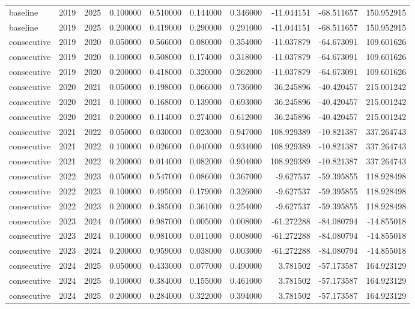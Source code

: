 \begin{tabular}{lrrrrrrrrr}
baseline & 2019 & 2025 & 0.100000 & 0.510000 & 0.144000 & 0.346000 & -11.044151 & -68.511657 & 150.952915 \\
baseline & 2019 & 2025 & 0.200000 & 0.419000 & 0.290000 & 0.291000 & -11.044151 & -68.511657 & 150.952915 \\
consecutive & 2019 & 2020 & 0.050000 & 0.566000 & 0.080000 & 0.354000 & -11.037879 & -64.673091 & 109.601626 \\
consecutive & 2019 & 2020 & 0.100000 & 0.508000 & 0.174000 & 0.318000 & -11.037879 & -64.673091 & 109.601626 \\
consecutive & 2019 & 2020 & 0.200000 & 0.418000 & 0.320000 & 0.262000 & -11.037879 & -64.673091 & 109.601626 \\
consecutive & 2020 & 2021 & 0.050000 & 0.198000 & 0.066000 & 0.736000 & 36.245896 & -40.420457 & 215.001242 \\
consecutive & 2020 & 2021 & 0.100000 & 0.168000 & 0.139000 & 0.693000 & 36.245896 & -40.420457 & 215.001242 \\
consecutive & 2020 & 2021 & 0.200000 & 0.114000 & 0.274000 & 0.612000 & 36.245896 & -40.420457 & 215.001242 \\
consecutive & 2021 & 2022 & 0.050000 & 0.030000 & 0.023000 & 0.947000 & 108.929389 & -10.821387 & 337.264743 \\
consecutive & 2021 & 2022 & 0.100000 & 0.026000 & 0.040000 & 0.934000 & 108.929389 & -10.821387 & 337.264743 \\
consecutive & 2021 & 2022 & 0.200000 & 0.014000 & 0.082000 & 0.904000 & 108.929389 & -10.821387 & 337.264743 \\
consecutive & 2022 & 2023 & 0.050000 & 0.547000 & 0.086000 & 0.367000 & -9.627537 & -59.395855 & 118.928498 \\
consecutive & 2022 & 2023 & 0.100000 & 0.495000 & 0.179000 & 0.326000 & -9.627537 & -59.395855 & 118.928498 \\
consecutive & 2022 & 2023 & 0.200000 & 0.385000 & 0.361000 & 0.254000 & -9.627537 & -59.395855 & 118.928498 \\
consecutive & 2023 & 2024 & 0.050000 & 0.987000 & 0.005000 & 0.008000 & -61.272288 & -84.080794 & -14.855018 \\
consecutive & 2023 & 2024 & 0.100000 & 0.981000 & 0.011000 & 0.008000 & -61.272288 & -84.080794 & -14.855018 \\
consecutive & 2023 & 2024 & 0.200000 & 0.959000 & 0.038000 & 0.003000 & -61.272288 & -84.080794 & -14.855018 \\
consecutive & 2024 & 2025 & 0.050000 & 0.433000 & 0.077000 & 0.490000 & 3.781502 & -57.173587 & 164.923129 \\
consecutive & 2024 & 2025 & 0.100000 & 0.384000 & 0.155000 & 0.461000 & 3.781502 & -57.173587 & 164.923129 \\
consecutive & 2024 & 2025 & 0.200000 & 0.284000 & 0.322000 & 0.394000 & 3.781502 & -57.173587 & 164.923129 \\
\bottomrule
\end{tabular}
